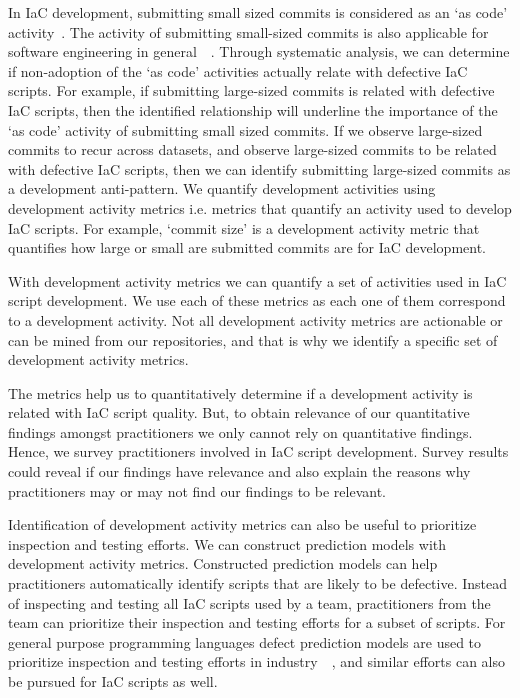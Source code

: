 \documentclass[smallextended]{svjour3}       %
\begin{document}
In IaC development, submitting small sized commits is considered as an `as code' activity~\citep{kief:iac:book}. The activity of submitting small-sized commits is also applicable for software engineering in general~\citep{storey:codereview:2018}~\citep{Rigby:Apache:CodeReview}. Through systematic analysis, we can determine if non-adoption of the `as code' activities actually relate with defective IaC scripts. For example, if submitting large-sized commits is related with defective IaC scripts, then the identified relationship will underline the importance of the `as code' activity of submitting small sized commits. If we observe large-sized commits to recur across datasets, and observe large-sized commits to be related with defective IaC scripts, then we can identify submitting large-sized commits as a development anti-pattern. We quantify development activities using development activity metrics i.e. metrics that quantify an activity used to develop IaC scripts. For example, `commit size' is a development activity metric that quantifies how large or small are submitted commits are for IaC development.   

With development activity metrics we can quantify a set of activities used in IaC script development. We use each of these metrics as each one of them correspond to a development activity. Not all development activity metrics are actionable or can be mined from our repositories, and that is why we identify a specific set of development activity metrics. 

The metrics help us to quantitatively determine if a development activity is related with IaC script quality. But, to obtain relevance of our quantitative findings amongst practitioners we only cannot rely on quantitative findings. Hence, we survey practitioners involved in IaC script development. Survey results could reveal if our findings have relevance and also explain the reasons why practitioners may or may not find our findings to be relevant.     

Identification of development activity metrics can also be useful to prioritize inspection and testing efforts. We can construct prediction models with development activity metrics. Constructed prediction models can help practitioners automatically identify scripts that are likely to be defective. Instead of inspecting and testing all IaC scripts used by a team, practitioners from the team can prioritize their inspection and testing efforts for a subset of scripts. For general purpose programming languages defect prediction models are used to prioritize inspection and testing efforts in industry~\citep{dp:industry:menzies}~\citep{TURHAN:dp:industry}, and similar efforts can also be pursued for IaC scripts as well.     
\end{document}
